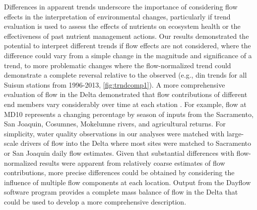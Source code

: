 \documentclass[letterpaper,12pt,oneside]{article}\usepackage[]{graphicx}\usepackage[]{color}
\begin{document}
Differences in apparent trends underscore the importance of considering flow effects in the interpretation of environmental changes, particularly if trend evaluation is used to assess the effects of nutrients on ecosystem health or the effectiveness of past nutrient management actions.  Our results demonstrated the potential to interpret different trends if flow effects are not considered, where the difference could vary from a simple change in the magnitude and significance of a trend, to more problematic changes where the flow-normalized trend could demonstrate a complete reversal relative to the observed (e.g., \ac{din} trends for all Suisun stations from 1996-2013, \cref{fig:trndcomp1}). A more comprehensive evaluation of flow in the Delta demonstrated that flow contributions of different end members vary considerably over time at each station \citep{Novick15}.  For example, flow at MD10 represents a changing percentage by season of inputs from the Sacramento, San Joaquin, Cosumnes, Mokelumne rivers, and agricultural returns.   For simplicity, water quality observations in our analyses were matched with large-scale drivers of flow into the Delta where most sites were matched to Sacramento or San Joaquin daily flow estimates.  Given that substantial differences with flow-normalized results were apparent from relatively coarse estimates of flow contributions, more precise differences could be obtained by considering the influence of multiple flow components at each location. Output from the Dayflow software program \citep{IEP16} provides a complete mass balance of flow in the Delta that could be used to develop a more comprehensive description.
\end{document}
